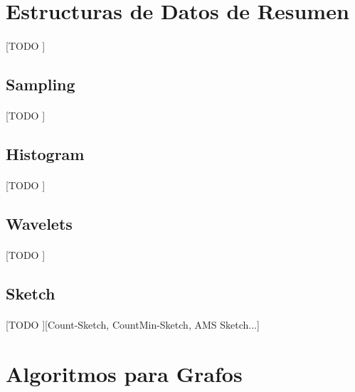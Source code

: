 \documentclass{article}
\begin{document}
  \section{Estructuras de Datos de Resumen}

    \paragraph{}
    [TODO ]

    \subsection{Sampling}

      \paragraph{}
      [TODO ]

    \subsection{Histogram}

      \paragraph{}
      [TODO ]

    \subsection{Wavelets}

      \paragraph{}
      [TODO ]

    \subsection{Sketch}

      \paragraph{}
      [TODO ][Count-Sketch, CountMin-Sketch, AMS Sketch...]

  \section{Algoritmos para Grafos}
\end{document}
